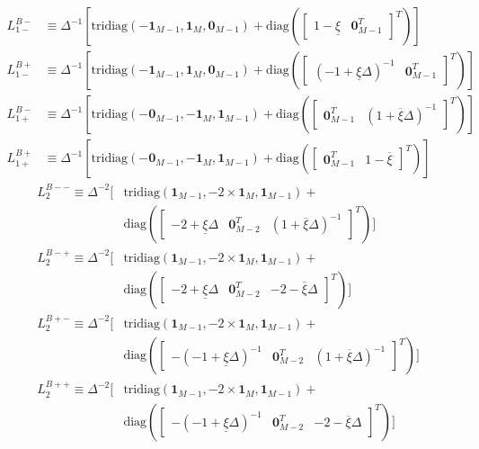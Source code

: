 \documentclass[11pt]{article}
\newcommand{\diag}{\ensuremath{\mathrm{diag}}}
\theoremstyle{definition}
\begin{document}
\begin{align}
L_{1-}^{B-} &\equiv \Delta^{-1}
\left[ 
\text{tridiag}(-\mathbf{1}_{M-1}, 
\mathbf{1}_{M}, \mathbf{0}_{M-1} ) + \diag \left( \begin{bmatrix}
1 - \underline{\xi} &
\mathbf{0}_{M-1}^T 
\end{bmatrix}^T
\right)
\right] \\
L_{1-}^{B+} &\equiv \Delta^{-1}
\left[ 
\text{tridiag}(-\mathbf{1}_{M-1}, 
\mathbf{1}_{M}, \mathbf{0}_{M-1} ) + \diag \left( \begin{bmatrix}
(-1+\underline{\xi} \Delta)^{-1} &
\mathbf{0}_{M-1}^T 
\end{bmatrix}^T
\right)
\right] 
\end{align}
\begin{align}
L_{1+}^{B-} &\equiv 
\Delta^{-1}
\left[ 
\text{tridiag}(-\mathbf{0}_{M-1}, 
\mathbf{-1}_{M}, \mathbf{1}_{M-1} ) + \diag \left( \begin{bmatrix}
\mathbf{0}_{M-1}^T &
(1+\overline{\xi} \Delta)^{-1}
\end{bmatrix}^T
\right)
\right] \\
L_{1+}^{B+} &\equiv 
\Delta^{-1}
\left[ 
\text{tridiag}(-\mathbf{0}_{M-1}, 
\mathbf{-1}_{M}, \mathbf{1}_{M-1} ) + \diag \left( \begin{bmatrix}
\mathbf{0}_{M-1}^T &
1- \overline{\xi} 
\end{bmatrix}^T
\right)
\right]
\end{align}
\begin{align}
L_2^{B--} \equiv  \Delta^{-2} 
\Big[ 
&\text{tridiag}(
\mathbf{1}_{M-1},
-2 \times \mathbf{1}_M,
\mathbf{1}_{M-1} )
+ \\
&\diag \left( \begin{bmatrix}
-2 + \underline{\xi}\Delta &
\mathbf{0}_{M-2}^T &
(1+\overline{\xi} \Delta)^{-1}
\end{bmatrix}^T \right)
\Big] \\
L_2^{B-+} \equiv  \Delta^{-2} 
\Big[ 
&\text{tridiag}(
\mathbf{1}_{M-1},
-2 \times \mathbf{1}_M,
\mathbf{1}_{M-1} )
+  \\
&\diag \left( \begin{bmatrix}
-2 + \underline{\xi}\Delta &
\mathbf{0}_{M-2}^T &
-2 - \overline{\xi}\Delta
\end{bmatrix}^T \right)
\Big] \\
L_2^{B+-} \equiv  \Delta^{-2} 
\Big[ 
&\text{tridiag}(
\mathbf{1}_{M-1},
-2 \times \mathbf{1}_M,
\mathbf{1}_{M-1} )
+ \\
&\diag \left( \begin{bmatrix}
-(-1+\underline{\xi} \Delta)^{-1}&
\mathbf{0}_{M-2}^T &
(1+\overline{\xi} \Delta)^{-1}
\end{bmatrix}^T \right)
\Big] \\
L_2^{B++} \equiv  \Delta^{-2} 
\Big[ 
&\text{tridiag}(
\mathbf{1}_{M-1},
-2 \times \mathbf{1}_M,
\mathbf{1}_{M-1} )
+  \\
&\diag \left( \begin{bmatrix}
-(-1+\underline{\xi} \Delta)^{-1}&
\mathbf{0}_{M-2}^T &
-2 - \overline{\xi}\Delta
\end{bmatrix}^T \right)
\Big]
\end{align}
\end{document}
